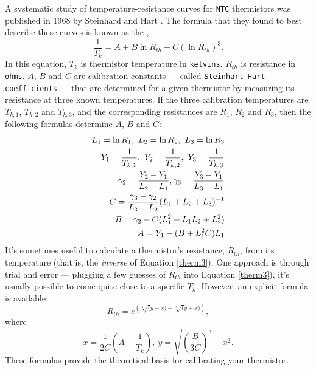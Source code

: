 A systematic study of temperature-resistance curves for \texttt{NTC} thermistors was published in 1968 by Steinhard and Hart \cite{STEINHART1968497}.
The formula that they found to best describe these curves is known as the ,
\begin{equation}\label{therm3}
\frac{1}{T_{k}} = A + B \ln R_{th} + C (\ln R_{th})^3.
\end{equation}
In this equation, $T_{k}$ is thermistor temperature in \texttt{kelvins}.
$R_{th}$ is resistance in \texttt{ohms}.
$A$, $B$ and $C$ are calibration constants --- called \texttt{Steinhart-Hart coefficients} ---  that are determined for a given thermistor by measuring its resistance at three known temperatures.
If the three calibration temperatures are $T_{k,1}$, $T_{k,2}$ and $T_{k,3}$, and the corresponding resistances are $R_1$, $R_2$ and $R_3$, then the following formulas determine $A$, $B$ and $C$:
\begin{eqnarray}
L_1 = \ln R_1, ~L_2 = \ln R_2, ~L_3 = \ln R_3  \nonumber \\
Y_1 = \frac{1}{T_{k,1}}, ~Y_2 = \frac{1}{T_{k,2}}, ~Y_3 = \frac{1}{T_{k,3}} \nonumber \\
\gamma_2 = \frac{Y_2-Y_1}{L_2-L_1}, \gamma_3 = \frac{Y_3-Y_1}{L_3-L_1} \nonumber \\
C = \frac{\gamma_3-\gamma_2}{L_3-L_2} (L_1+L_2+L_3)^{-1}  \label{therm4}\\
B = \gamma_2 - C(L_1^2 + L_1 L_2 + L_2^2) \nonumber \\
A = Y_1 - (B+L_1^2 C) L_1 \nonumber 
\end{eqnarray}
It's sometimes useful to calculate a thermistor's resistance, $R_{th}$, from its temperature (that is, the \emph{inverse} of Equation \ref{therm3}).
One approach is through trial and error --- plugging a few guesses of $R_{th}$ into Equation \ref{therm3}), it's usually possible to come quite close to a specific $T_k$.
However, an explicit formula is available:
\begin{equation}\label{therm5}
R_{th} = e^{\left(\sqrt[3](y-x) - \sqrt[3](y+x)\right)} ,
\end{equation}
where
\begin{equation}\label{therm6}
x = \frac{1}{2C} \left( A - \frac{1}{T_{k}} \right), ~ y = \sqrt{\left(\frac{B}{3C}\right)^3+x^2}.
\end{equation}
These formulas provide the theoretical basis for calibrating your thermistor.

